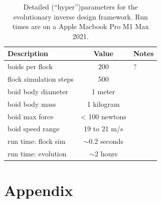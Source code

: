 \documentclass[letterpaper]{article}
\begin{document}
\begin{table}[t]
\centering
\begin{tabular}{ | l | c | l | }
    \hline
    \textbf{Description} & \textbf{Value} & \textbf{Notes} \\
    \hline
    boids per flock & 200 & ? \\
    flock simulation steps & 500 & \\
    boid body diameter & 1 meter & \\
    boid body mass & 1 kilogram & \\
    boid max force & < 100 newtons & \\
    boid speed range & 19 to 21 m/s & \\
    run time: flock sim & $\sim$0.2 seconds & \\
    run time: evolution & $\sim$2 hours \\
    \hline
\end{tabular}
\caption{Detailed (``hyper'')parameters for the evolutionary inverse design framework. Run times are on a Apple Macbook Pro M1 Max 2021.}
\label{table:parameters}
\end{table}






\appendix
\onecolumn
\section{Appendix}
\label{sec:appendix}
\end{document}
